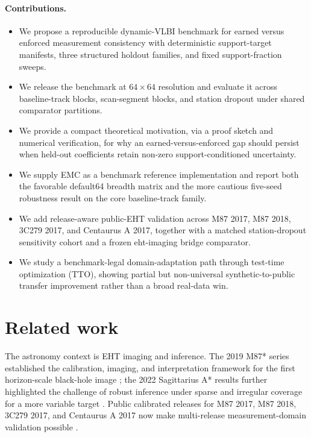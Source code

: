 \documentclass[fleqn,usenatbib]{mnras}
\begin{document}
\paragraph*{Contributions.}
\begin{itemize}
\item We propose a reproducible dynamic-VLBI benchmark for earned versus enforced measurement consistency with deterministic support-target manifests, three structured holdout families, and fixed support-fraction sweeps.
\item We release the benchmark at $64\times64$ resolution and evaluate it across baseline-track blocks, scan-segment blocks, and station dropout under shared comparator partitions.
\item We provide a compact theoretical motivation, via a proof sketch and numerical verification, for why an earned-versus-enforced gap should persist when held-out coefficients retain non-zero support-conditioned uncertainty.
\item We supply EMC as a benchmark reference implementation and report both the favorable default64 breadth matrix and the more cautious five-seed robustness result on the core baseline-track family.
\item We add release-aware public-EHT validation across M87 2017, M87 2018, 3C279 2017, and Centaurus A 2017, together with a matched station-dropout sensitivity cohort and a frozen eht-imaging bridge comparator.
\item We study a benchmark-legal domain-adaptation path through test-time optimization (TTO), showing partial but non-universal synthetic-to-public transfer improvement rather than a broad real-data win.
\end{itemize}

\section{Related work}

The astronomy context is EHT imaging and inference. The 2019 M87* series established the calibration, imaging, and interpretation framework for the first horizon-scale black-hole image \citep{EHT2019M87I,EHT2019M87III,EHT2019M87IV,EHT2019M87V,EHT2019M87VI}; the 2022 Sagittarius A* results further highlighted the challenge of robust inference under sparse and irregular coverage for a more variable target \citep{EHT2022SgrAI,EHT2022SgrAII,EHT2022SgrAIII,EHT2022SgrAIV,EHT2022SgrAV}. Public calibrated releases for M87 2017, M87 2018, 3C279 2017, and Centaurus A 2017 now make multi-release measurement-domain validation possible \citep{EHT2019PublicM87DataRelease,EHT2024PublicM87DataRelease,EHT2020Public3C279DataRelease,EHT2021PublicCenADataRelease}.
\end{document}
